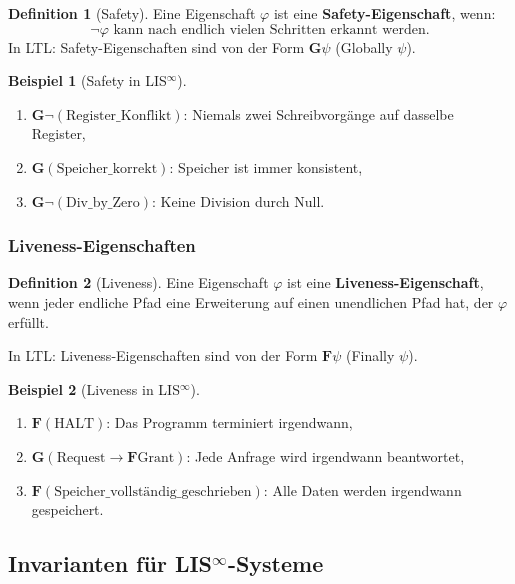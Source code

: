 \documentclass[a4paper,12pt]{article}
\theoremstyle{definition}
\newtheorem{definition}{Definition}
\newtheorem{beispiel}{Beispiel}
\begin{document}
	\begin{definition}[Safety]
		\label{def:safety}
		Eine Eigenschaft $\varphi$ ist eine \textbf{Safety-Eigenschaft}, wenn:
		\[
		\neg \varphi \text{ kann nach endlich vielen Schritten erkannt werden}.
		\]
		In LTL: Safety-Eigenschaften sind von der Form $\mathbf{G}\psi$ (Globally $\psi$).
	\end{definition}
	
	\begin{beispiel}[Safety in LIS$^{\infty}$]
		\begin{enumerate}
			\item $\mathbf{G}\neg(\text{Register\_Konflikt})$: Niemals zwei Schreibvorgänge auf dasselbe Register,
			\item $\mathbf{G}(\text{Speicher\_korrekt})$: Speicher ist immer konsistent,
			\item $\mathbf{G}\neg(\text{Div\_by\_Zero})$: Keine Division durch Null.
		\end{enumerate}
	\end{beispiel}
	
	\subsubsection{Liveness-Eigenschaften}
	
	\begin{definition}[Liveness]
		\label{def:liveness}
		Eine Eigenschaft $\varphi$ ist eine \textbf{Liveness-Eigenschaft}, wenn jeder endliche Pfad eine Erweiterung auf einen unendlichen Pfad hat, der $\varphi$ erfüllt.
		
		In LTL: Liveness-Eigenschaften sind von der Form $\mathbf{F}\psi$ (Finally $\psi$).
	\end{definition}
	
	\begin{beispiel}[Liveness in LIS$^{\infty}$]
		\begin{enumerate}
			\item $\mathbf{F}(\text{HALT})$: Das Programm terminiert irgendwann,
			\item $\mathbf{G}(\text{Request} \to \mathbf{F}\text{Grant})$: Jede Anfrage wird irgendwann beantwortet,
			\item $\mathbf{F}(\text{Speicher\_vollständig\_geschrieben})$: Alle Daten werden irgendwann gespeichert.
		\end{enumerate}
	\end{beispiel}
	
	\subsection{Invarianten für LIS$^{\infty}$-Systeme}
	
\end{document}

